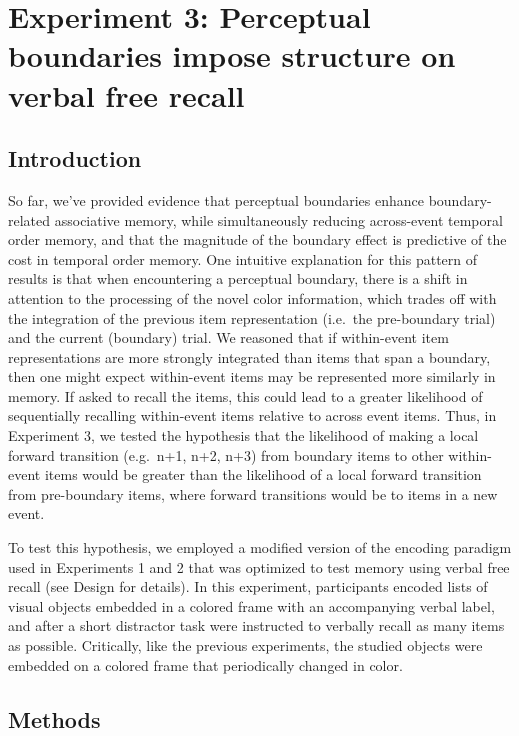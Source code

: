 \section{Experiment 3: Perceptual boundaries impose structure on verbal
free
recall}\label{experiment-3-perceptual-boundaries-impose-structure-on-verbal-free-recall}

\subsection{Introduction}\label{introduction-2}

So far, we've provided evidence that perceptual boundaries enhance
boundary-related associative memory, while simultaneously reducing
across-event temporal order memory, and that the magnitude of the
boundary effect is predictive of the cost in temporal order memory. One
intuitive explanation for this pattern of results is that when
encountering a perceptual boundary, there is a shift in attention to the
processing of the novel color information, which trades off with the
integration of the previous item representation (i.e.~the pre-boundary
trial) and the current (boundary) trial. We reasoned that if
within-event item representations are more strongly integrated than
items that span a boundary, then one might expect within-event items may
be represented more similarly in memory. If asked to recall the items,
this could lead to a greater likelihood of sequentially recalling
within-event items relative to across event items. Thus, in Experiment
3, we tested the hypothesis that the likelihood of making a local
forward transition (e.g.~n+1, n+2, n+3) from boundary items to other
within-event items would be greater than the likelihood of a local
forward transition from pre-boundary items, where forward transitions
would be to items in a new event.

To test this hypothesis, we employed a modified version of the encoding
paradigm used in Experiments 1 and 2 that was optimized to test memory
using verbal free recall (see Design for details). In this experiment,
participants encoded lists of visual objects embedded in a colored frame
with an accompanying verbal label, and after a short distractor task
were instructed to verbally recall as many items as possible.
Critically, like the previous experiments, the studied objects were
embedded on a colored frame that periodically changed in color.

\subsection{Methods}\label{methods-2}

